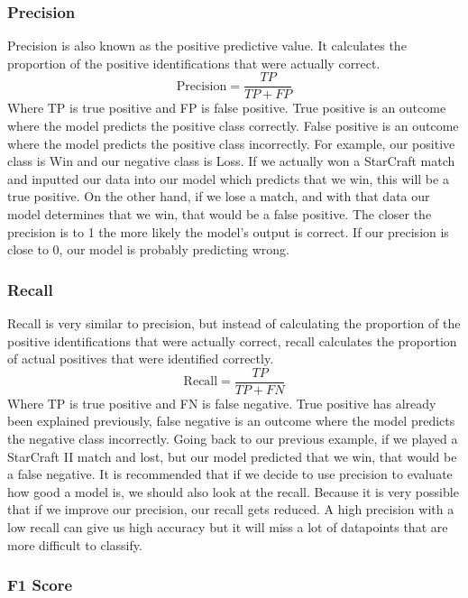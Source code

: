 \documentclass[a4paper,12pt]{report}
\begin{document}
\subsubsection{Precision}

Precision is also known as the positive predictive value. It calculates the proportion of the positive identifications that were actually correct.
$$\text{Precision}=\frac{TP}{TP+FP}$$
Where TP  is true positive and FP is false positive. True positive is an outcome where the model predicts the positive class correctly. False positive is an outcome where the model predicts the positive class incorrectly. For example, our positive class is Win and our negative class is Loss. If we actually won a StarCraft match and inputted our data into our model which predicts that we win, this will be a true positive. On the other hand, if we lose a match, and with that data our model determines that we win, that would be a false positive. The closer the precision is to 1 the more likely the model’s output is correct. If our precision is close to 0, our model is probably predicting wrong.
 
\subsubsection{Recall}

Recall is very similar to precision, but instead of calculating the proportion of the positive identifications that were actually correct, recall calculates the proportion of actual positives that were identified correctly.
$$\text{Recall}=\frac{TP}{TP+FN}$$
Where TP is true positive and FN is false negative. True positive has already been explained previously, false negative is an outcome where the model predicts the negative class incorrectly. Going back to our previous example, if we played a StarCraft II match and lost, but our model predicted that we win, that would be a false negative. It is recommended that if we decide to use precision to evaluate how good a model is, we should also look at the recall. Because it is very possible that if we improve our precision, our recall gets reduced. A high precision with a low recall can give us high accuracy but it will miss a lot of datapoints that are more difficult to classify.
 
\subsubsection{F1 Score}
\end{document}
